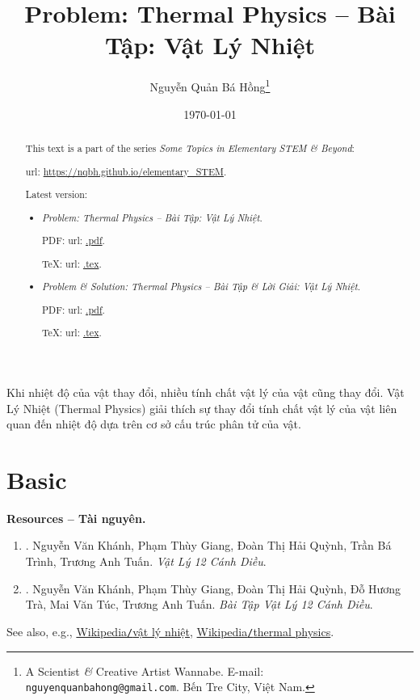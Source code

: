 \documentclass{article}
\title{Problem: Thermal Physics -- Bài Tập: Vật Lý Nhiệt}
\author{Nguyễn Quản Bá Hồng\footnote{A Scientist {\it\&} Creative Artist Wannabe. E-mail: {\tt nguyenquanbahong@gmail.com}. Bến Tre City, Việt Nam.}}
\date{\today}
\begin{document}
\maketitle
\begin{abstract}
	This text is a part of the series {\it Some Topics in Elementary STEM \& Beyond}:
	
	{\sc url}: \url{https://nqbh.github.io/elementary_STEM}.
	
	Latest version:
	\begin{itemize}
		\item {\it Problem: Thermal Physics -- Bài Tập: Vật Lý Nhiệt}.
		
		PDF: {\sc url}: \url{.pdf}.
		
		\TeX: {\sc url}: \url{.tex}.
		\item {\it Problem \& Solution: Thermal Physics -- Bài Tập \& Lời Giải: Vật Lý Nhiệt}.
		
		PDF: {\sc url}: \url{.pdf}.
		
		\TeX: {\sc url}: \url{.tex}.
	\end{itemize}
\end{abstract}
Khi nhiệt độ của vật thay đổi, nhiều tính chất vật lý của vật cũng thay đổi. Vật Lý Nhiệt (Thermal Physics) giải thích sự thay đổi tính chất vật lý của vật liên quan đến nhiệt độ dựa trên cơ sở cấu trúc phân tử của vật.

\tableofcontents


\section{Basic}
\textbf{\textsf{Resources -- Tài nguyên.}}
\begin{enumerate}
	\item \cite[Chủ đề 1: {\it Vật Lý Nhiệt}]{SGK_Vat_Ly_12_CD}. {\sc Nguyễn Văn Khánh, Phạm Thùy Giang, Đoàn Thị Hải Quỳnh, Trần Bá Trình, Trương Anh Tuấn}. {\it Vật Lý 12 Cánh Diều}.
	
	\item \cite[Chủ đề 1: {\it Vật Lý Nhiệt}]{SBT_Vat_Ly_12_CD}. {\sc Nguyễn Văn Khánh, Phạm Thùy Giang, Đoàn Thị Hải Quỳnh, Đỗ Hương Trà, Mai Văn Túc, Trương Anh Tuấn}. {\it Bài Tập Vật Lý 12 Cánh Diều}.
\end{enumerate}
See also, e.g., \href{https://vi.wikipedia.org/wiki/V%E1%BA%ADt_l%C3%BD_nhi%E1%BB%87t}{Wikipedia{\tt/}vật lý nhiệt}, \href{https://en.wikipedia.org/wiki/Thermal_physics}{Wikipedia{\tt/}thermal physics}.
\end{document}
